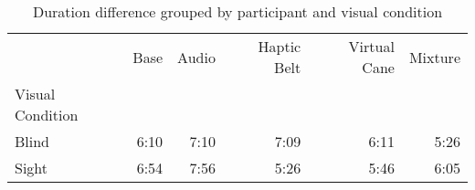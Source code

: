 
\begin{table}[!htb]
\centering
\caption{Duration difference grouped by participant and visual condition}
\label{tab:duracao_min_average_group}
\begin{tabular}{lrrrrr}
\toprule
{} &  Base & Audio & Haptic Belt & Virtual Cane & Mixture \\
Visual Condition &       &       &             &              &         \\
\midrule
Blind            &  6:10 &  7:10 &        7:09 &         6:11 &    5:26 \\
Sight            &  6:54 &  7:56 &        5:26 &         5:46 &    6:05 \\
\bottomrule
\end{tabular}
\end{table}

